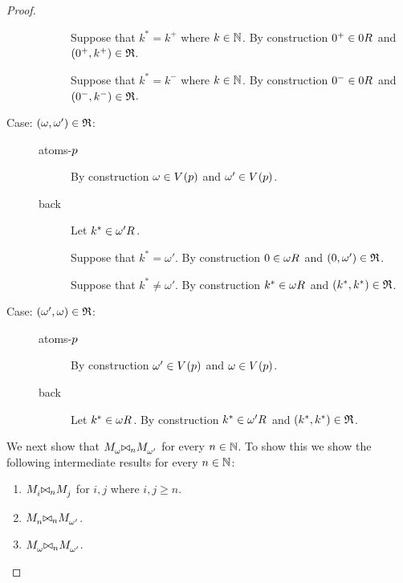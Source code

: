 \begin{proof}
\begin{description}
\begin{description}
                Suppose that $k^* = k^+$ where $k \in \mathbb{N}$.
                By construction $0^+ \in \kSuccessors{}{0}$ and $(0^+, k^+) \in \mathfrak{R}$.

                Suppose that $k^* = k^-$ where $k \in \mathbb{N}$.
                By construction $0^- \in \kSuccessors{}{0}$ and $(0^-, k^-) \in \mathfrak{R}$.
        \end{description}
    \item[Case: $(\omega, \omega') \in \mathfrak{R}$:]\hfill
        \begin{description}
            \item[atoms-$p$]
                By construction $\omega \in \kValuation(\atomP)$ and $\omega' \in \kValuation(\atomP)$.
            \item[back]
                Let $k^* \in \kSuccessors{}{\omega'}$.

                Suppose that $k^* = \omega'$.
                By construction $0 \in \kSuccessors{}{\omega}$ and $(0, \omega') \in \mathfrak{R}$.

                Suppose that $k^* \neq \omega'$.
                By construction $k^* \in \kSuccessors{}{\omega}$ and $(k^*, k^*) \in \mathfrak{R}$.
        \end{description}
    \item[Case: $(\omega', \omega) \in \mathfrak{R}$:]\hfill
        \begin{description}
            \item[atoms-$p$]
                By construction $\omega' \in \kValuation(\atomP)$ and $\omega \in \kValuation(\atomP)$.
            \item[back]
                Let $k^* \in \kSuccessors{}{\omega}$.
                By construction $k^* \in \kSuccessors{}{\omega'}$ and $(k^*, k^*) \in \mathfrak{R}$.
        \end{description}
\end{description}

We next show that $\kPModel{\omega} \bisimref[n] \kPModel{\omega'}$ for every $n \in \mathbb{N}$. 
To show this we show the following intermediate results for every $n \in \mathbb{N}$:
\begin{enumerate}
    \item $\kPModel{i} \bisimref[n] \kPModel{j}$ for $i, j$ where $i, j \geq n$.
    \item $\kPModel{n} \bisimref[n] \kPModel{\omega'}$.
    \item $\kPModel{\omega} \bisimref[n] \kPModel{\omega'}$.
\end{enumerate}


\end{proof}
